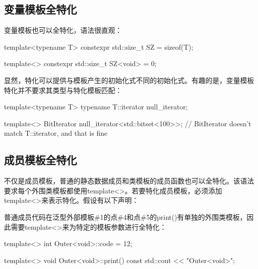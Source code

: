 \subsection{变量模板全特化}

变量模板也可以全特化，语法很直观：

\begin{cpp}
template<typename T> constexpr std::size_t SZ = sizeof(T);

template<> constexpr std::size_t SZ<void> = 0;
\end{cpp}

显然，特化可以提供与模板产生的初始化式不同的初始化式。有趣的是，变量模板特化并不要求其类型与特化模板匹配：

\begin{cpp}
template<typename T> typename T::iterator null_iterator;

template<> BitIterator null_iterator<std::bitset<100>>;
// BitIterator doesn't match T::iterator, and that is fine
\end{cpp}

\subsection{成员模板全特化}

不仅是成员模板，普通的静态数据成员和类模板的成员函数也可以全特化。该语法要求每个外围类模板都使用template<>。若要特化成员模板，必须添加template<>来表示特化。假设有以下声明：


普通成员代码在泛型外部模板\#1的点\#4和点\#5的print()有单独的外围类模板，因此需要template<>来为特定的模板参数进行全特化：

\begin{cpp}
template<>
int Outer<void>::code = 12;

template<>
void Outer<void>::print() const {
	std::cout << "Outer<void>";
}
\end{cpp}

